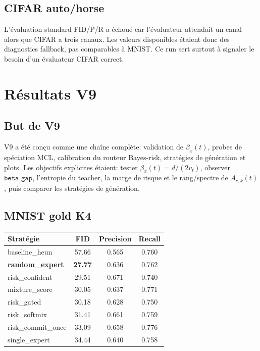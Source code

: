 \documentclass[11pt,a4paper]{article}
\newcommand{\1}{\mathbf{1}}
\begin{document}
\subsection{CIFAR auto/horse}

L'évaluation standard FID/P/R a échoué car l'évaluateur attendait un canal alors que CIFAR a trois canaux. Les valeurs disponibles étaient donc des diagnostics fallback, pas comparables à MNIST. Ce run sert surtout à signaler le besoin d'un évaluateur CIFAR correct.

\section{Résultats V9}

\subsection{But de V9}

V9 a été conçu comme une chaîne complète: validation de $\beta_x(t)$, probes de spéciation MCL, calibration du routeur Bayes-risk, stratégies de génération et plots. Les objectifs explicites étaient: tester $\beta_x(t)=d/(2v_t)$, observer $\texttt{beta\_gap}$, l'entropie du teacher, la marge de risque et le rang/spectre de $A_{c,k}(t)$, puis comparer les stratégies de génération.

\subsection{MNIST gold K4}

\begin{center}
\begin{tabular}{lccc}
\toprule
Stratégie & FID & Precision & Recall\\
\midrule
baseline\_heun & 57.66 & 0.565 & 0.760\\
\textbf{random\_expert} & \textbf{27.77} & 0.636 & 0.762\\
risk\_confident & 29.51 & 0.671 & 0.740\\
mixture\_score & 30.05 & 0.637 & 0.771\\
risk\_gated & 30.18 & 0.628 & 0.750\\
risk\_softmix & 31.41 & 0.661 & 0.759\\
risk\_commit\_once & 33.09 & 0.658 & 0.776\\
single\_expert & 34.44 & 0.640 & 0.758\\
\bottomrule
\end{tabular}
\end{center}
\end{document}
